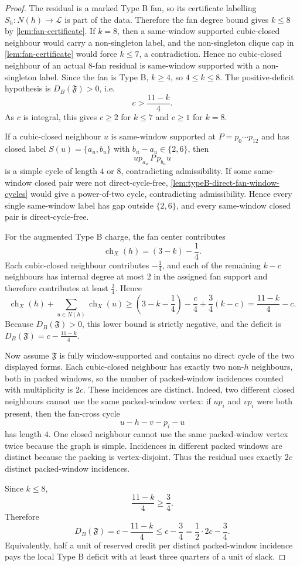 \documentclass[11pt]{article}
\newcommand{\labels}{\mathcal L}
\newcommand{\ch}{\operatorname{ch}}
\begin{document}
\begin{proof}
The residual is a marked Type B fan, so its certificate labelling
$S_h:N(h)\to\labels$ is part of the data.  Therefore the fan degree bound gives
$k\le8$ by \cref{lem:fan-certificate}.  If $k=8$, then a same-window supported
cubic-closed neighbour would carry a non-singleton label, and the non-singleton
clique cap in \cref{lem:fan-certificate} would force $k\le7$, a contradiction.
Hence no cubic-closed neighbour of an actual $8$-fan residual is same-window
supported with a non-singleton label.  Since the fan is Type B, $k\ge4$, so
$4\le k\le8$.  The positive-deficit hypothesis is
$D_B(\mathfrak F)>0$, i.e.
\[
c>\frac{11-k}{4}.
\]
As $c$ is integral, this gives $c\ge2$ for $k\le7$ and $c\ge1$ for $k=8$.

If a cubic-closed neighbour $u$ is same-window supported at
$P=p_0\cdots p_{12}$ and has closed label $S(u)=\{a_u,b_u\}$ with
$b_u-a_u\in\{2,6\}$, then
\[
u p_{a_u}\,P\,p_{b_u}u
\]
is a simple cycle of length $4$ or $8$, contradicting admissibility.  If some
same-window closed pair were not direct-cycle-free,
\cref{lem:typeB-direct-fan-window-cycles} would give a power-of-two cycle,
contradicting admissibility.  Hence every single same-window label has gap
outside $\{2,6\}$, and every same-window closed pair is direct-cycle-free.

For the augmented Type B charge, the fan center contributes
\[
\ch_X(h)=(3-k)-\frac14.
\]
Each cubic-closed neighbour contributes $-\tfrac14$, and each of the remaining
$k-c$ neighbours has internal degree at most $2$ in the assigned fan support and
therefore contributes at least $\tfrac34$.  Hence
\[
\ch_X(h)+\sum_{u\in N(h)}\ch_X(u)
\ge
\left(3-k-\frac14\right)-\frac c4+\frac34(k-c)
=\frac{11-k}{4}-c .
\]
Because $D_B(\mathfrak F)>0$, this lower bound is strictly negative, and the
deficit is $D_B(\mathfrak F)=c-\frac{11-k}{4}$.

Now assume $\mathfrak F$ is fully window-supported and contains no direct cycle
of the two displayed forms.  Each cubic-closed neighbour has exactly two
non-$h$ neighbours, both in packed windows, so the number of packed-window
incidences counted with multiplicity is $2c$.  These incidences are distinct.
Indeed, two different closed neighbours cannot use the same packed-window
vertex: if $up_i$ and $vp_i$ were both present, then the fan-cross cycle
\[
u-h-v-p_i-u
\]
has length $4$.  One closed neighbour cannot use the same packed-window vertex
twice because the graph is simple.  Incidences in different packed windows are
distinct because the packing is vertex-disjoint.  Thus the residual uses
exactly $2c$ distinct packed-window incidences.

Since $k\le8$,
\[
\frac{11-k}{4}\ge\frac34.
\]
Therefore
\[
D_B(\mathfrak F)=c-\frac{11-k}{4}\le c-\frac34
=\frac12\cdot 2c-\frac34.
\]
Equivalently, half a unit of reserved credit per distinct packed-window
incidence pays the local Type B deficit with at least three quarters of a unit of
slack.
\end{proof}
\end{document}
